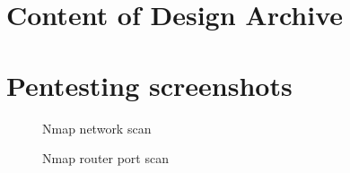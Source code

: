 \documentclass{article}
\begin{document}
\section{Content of Design Archive}


\section{Pentesting screenshots}\label{sec:appendix-pen-testing}

\begin{figure}[!htb]
	\caption{Nmap network scan}
\end{figure}

\begin{figure}[!htb]
	\caption{Nmap router port scan}
\end{figure}
\end{document}
